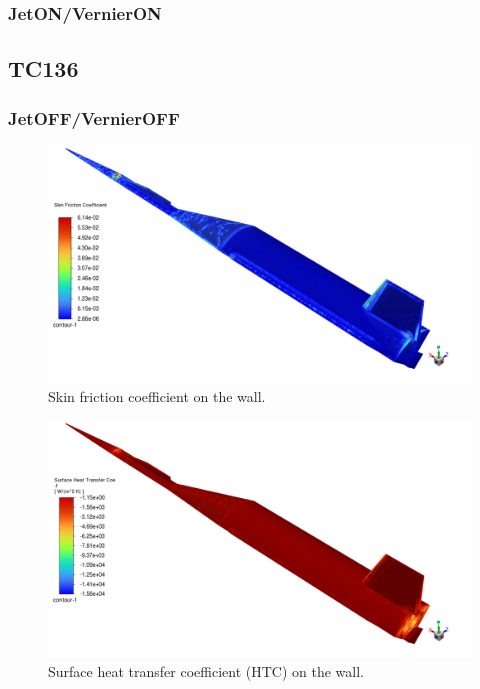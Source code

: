 \documentclass[12pt]{article}
\begin{document}
\subsubsection{JetON/VernierON}

\subsection{\textbf{TC136}}\label{sec:TC136}

\subsubsection{JetOFF/VernierOFF}

\begin{figure}[H] %
    \centering
    \includegraphics[width=\linewidth]{figs/t136s/t136s_M5p26_jetOFFVernierOFF_Cf.png}
    \caption{Skin friction coefficient on the wall.}
    \label{fig:t136s_cf_offoff}
\end{figure}

\begin{figure}[H] %
    \centering
    \includegraphics[width=\linewidth]{figs/t136s/t136s_M5p26_jetOFFVernierOFF_HTC.png}
    \caption{Surface heat transfer coefficient (HTC) on the wall.}
    \label{fig:t136s_htc_offoff}
\end{figure}
\end{document}
